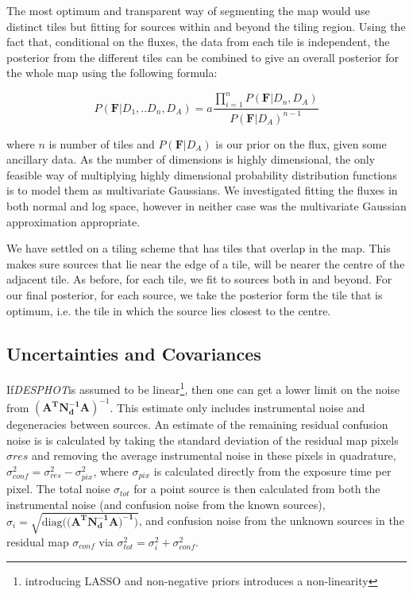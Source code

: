\documentclass[useAMS,usenatbib]{mnras}
\begin{document}
The most optimum and transparent way of segmenting the map would use distinct tiles but fitting for sources within and beyond the tiling region. Using the fact that, conditional on the fluxes, the data from each tile is independent, the posterior from the different tiles can be combined to give an overall posterior for the whole map using the following formula:

\begin{equation}
P(\mathbf{F}|D_1,..D_n,D_A)=a\frac{\prod_{i=1}^n P(\mathbf{F}|D_n,D_A)}{P(\mathbf{F}|D_A)^{n-1}}
\end{equation}

where $n$ is number of tiles and $P(\mathbf{F}|D_A)$ is our prior on the flux, given some ancillary data. As the number of dimensions is highly dimensional, the only feasible way of multiplying highly dimensional probability distribution functions is to model them as multivariate Gaussians. We investigated fitting the fluxes in both normal and log space, however in neither case was the multivariate Gaussian approximation appropriate.

We have settled on a tiling scheme that has tiles that overlap in the map. This makes sure sources that lie near the edge of a tile, will be nearer the centre of the adjacent tile. As before, for each tile, we fit to sources both in and beyond. For our final posterior, for each source, we take the posterior form the tile that is optimum, i.e. the tile in which the source lies closest to the centre.

\subsection{Uncertainties and Covariances}
If\emph{DESPHOT}is assumed to be linear\footnote{introducing LASSO and non-negative priors introduces a non-linearity}, then one can get a lower limit on the noise from $(\mathbf{A^TN_d^{-1}A})^{-1}$. This estimate only includes instrumental noise and degeneracies between sources. An estimate of the remaining residual confusion noise is is calculated by taking the standard deviation of the residual map pixels $\sigma{res}$ and removing the average instrumental noise in these pixels in quadrature, $\sigma^2_{conf} = \sigma^2_{res} - \sigma^2_{pix}$, where $\sigma_{pix}$ is calculated directly from the exposure time per pixel. The total noise $\sigma_{tot}$ for a point source is then calculated from both the instrumental noise (and confusion noise from the known sources), $\sigma_{i} = \sqrt{\mathrm{diag}((\mathbf{A^TN^{-1}_dA)^{-1})}}$, and confusion noise from the unknown sources in the residual map $\sigma_{conf}$ via $\sigma^2_{tot} = \sigma^2_{i} + \sigma^2_{conf}$. 
\end{document}
